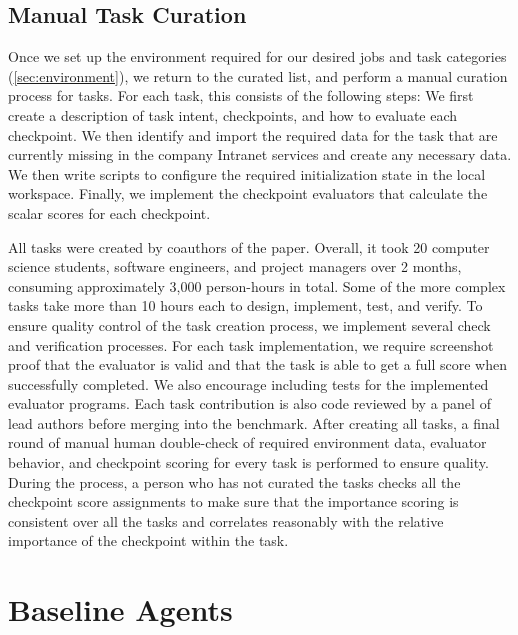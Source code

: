 \documentclass{article}
\begin{document}
\subsection{Manual Task Curation}
\vspace{-1mm}
Once we set up the environment required for our desired jobs and task categories (\autoref{sec:environment}), we return to the curated list, and perform a manual curation process for tasks.
For each task, this consists of the following steps:
We first create a description of task intent, checkpoints, and how to evaluate each checkpoint.
We then identify and import the required data for the task that are currently missing in the company Intranet services and create any necessary data.
We then write scripts to configure the required initialization state in the local workspace. 
Finally, we implement the checkpoint evaluators that calculate the scalar scores for each checkpoint.

All tasks were created by coauthors of the paper.
Overall, it took 20 computer science students, software engineers, and project managers over 2 months,
consuming approximately 3,000 person-hours in total.
Some of the more complex tasks take more than 10 hours each to design, implement, test, and verify.
To ensure quality control of the task creation process, we implement several check and verification processes.
For each task implementation, we require screenshot proof that the evaluator is valid and that the task is able to get a full score when successfully completed.
We also encourage including tests for the implemented evaluator programs.
Each task contribution is also code reviewed by a panel of lead authors before merging into the benchmark.
After creating all tasks, a final round of manual human double-check of required environment data, evaluator behavior, and checkpoint scoring for every task is performed to ensure quality.
During the process, a person who has not curated the tasks checks all the checkpoint score assignments to make sure that the importance scoring is consistent over all the tasks and correlates reasonably with the relative importance of the checkpoint within the task.

\section{Baseline Agents}
\label{sec:baseline_agent}
\end{document}
